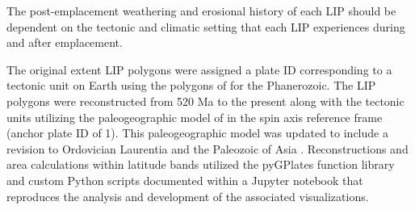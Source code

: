 \documentclass[11pt,letterpaper]{article}
\begin{document}
The post-emplacement weathering and erosional history of each LIP should be dependent on the tectonic and climatic setting that each LIP experiences during and after emplacement. 

The original extent LIP polygons were assigned a plate ID corresponding to a tectonic unit on Earth using the polygons of \cite{Torsvik2016a} for the Phanerozoic. The LIP polygons were reconstructed from 520 Ma to the present along with the tectonic units utilizing the paleogeographic model of \cite{Torsvik2016a} in the spin axis reference frame (anchor plate ID of 1). This paleogeographic model was updated to include a revision to Ordovician Laurentia \citep{Swanson-Hysell2017a} and the Paleozoic of Asia \citep{Domeier2018a}. Reconstructions and area calculations within latitude bands utilized the pyGPlates function library and custom Python scripts documented within a Jupyter notebook that reproduces the analysis and development of the associated visualizations. 
\end{document}
